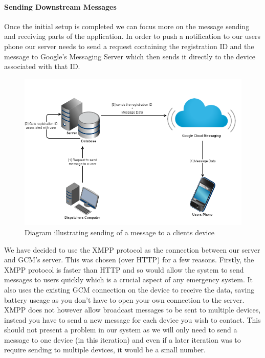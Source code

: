 \documentclass{article}
\begin{document}
	
		\paragraph{Sending Downstream Messages}
		Once the initial setup is completed we can focus more on the message sending and receiving parts of the application. In order to push a notification to our users phone our server needs to send a request containing the registration ID and the message to Google's Messaging Server which then sends it directly to the device associated with that ID.\\

	\begin{figure}[H]
		\centering
		\includegraphics[width=1\textwidth]{"Sending a message via GCM - Iteration 0"}
		\caption{Diagram illustrating sending of a message to a clients device}
	\end{figure}
	
	We have decided to use the XMPP protocol as the connection between our server and GCM's server. This was chosen (over HTTP) for a few reasons. Firstly, the XMPP protocol is faster than HTTP and so would allow the system to send messages to users quickly which is a crucial aspect of any emergency system. It also uses the existing GCM connection on the device to receive the data, saving battery useage as you don't have to open your own connection to the server. XMPP does not however allow broadcast messages to be sent to multiple devices, instead you have to send a new message for each device you wish to contact. This should not present a problem in our system as we will only need to send a message to one device (in this iteration) and even if a later iteration was to require sending to multiple devices, it would be a small number.\\
	
\end{document}
